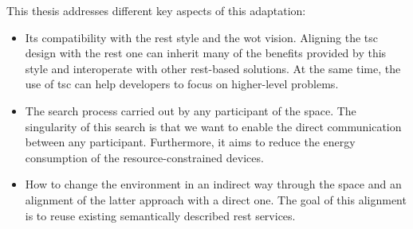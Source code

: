 This thesis addresses different key aspects of this adaptation:
\begin{itemize}
  \item Its compatibility with the \acs{rest} style and the \ac{wot} vision.
	Aligning the \ac{tsc} design with the \ac{rest} one can inherit many of the benefits provided by this style and interoperate with other \ac{rest}-based solutions.
	At the same time, the use of \ac{tsc} can help developers to focus on higher-level problems.
  \item The search process carried out by any participant of the space.
	The singularity of this search is that we want to enable the direct communication between any participant.
	Furthermore, it aims to reduce the energy consumption of the resource-constrained devices.
  \item How to change the environment in an indirect way through the space and an alignment of the latter approach with a direct one.
	The goal of this alignment is to reuse existing semantically described \ac{rest} services.
\end{itemize}
